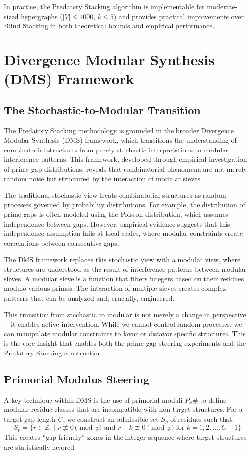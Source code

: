 \documentclass[12pt]{article}
\begin{document}
In practice, the Predatory Stacking algorithm is implementable for moderate-sized hypergraphs ($|V| \leq 1000$, $k \leq 5$) and provides practical improvements over Blind Stacking in both theoretical bounds and empirical performance.

\section{Divergence Modular Synthesis (DMS) Framework}

\subsection{The Stochastic-to-Modular Transition}
The Predatory Stacking methodology is grounded in the broader Divergence Modular Synthesis (DMS) framework, which transitions the understanding of combinatorial structures from purely stochastic interpretations to modular interference patterns. This framework, developed through empirical investigation of prime gap distributions, reveals that combinatorial phenomena are not merely random noise but structured by the interaction of modular sieves.

The traditional stochastic view treats combinatorial structures as random processes governed by probability distributions. For example, the distribution of prime gaps is often modeled using the Poisson distribution, which assumes independence between gaps. However, empirical evidence suggests that this independence assumption fails at local scales, where modular constraints create correlations between consecutive gaps.

The DMS framework replaces this stochastic view with a modular view, where structures are understood as the result of interference patterns between modular sieves. A modular sieve is a function that filters integers based on their residues modulo various primes. The interaction of multiple sieves creates complex patterns that can be analyzed and, crucially, engineered.

This transition from stochastic to modular is not merely a change in perspective—it enables active intervention. While we cannot control random processes, we can manipulate modular constraints to favor or disfavor specific structures. This is the core insight that enables both the prime gap steering experiments and the Predatory Stacking construction.

\subsection{Primorial Modulus Steering}
A key technique within DMS is the use of primorial moduli $P_k\#$ to define modular residue classes that are incompatible with non-target structures. For a target gap length $C$, we construct an admissible set $S_p$ of residues such that:
\begin{equation}
S_p = \{r \in \mathbb{Z}_p \mid r \not\equiv 0 \pmod{p} \text{ and } r + k \not\equiv 0 \pmod{p} \text{ for } k = 1, 2, \ldots, C-1\}
\end{equation}
This creates ``gap-friendly'' zones in the integer sequence where target structures are statistically favored.
\end{document}
